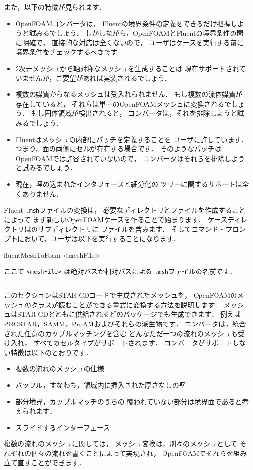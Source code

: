 また，以下の特徴が見られます．
\begin{itemize}
 \item OpenFOAMコンバータは，
       Fluentの境界条件の定義をできるだけ把握しようと試みるでしょう．
       しかしながら，OpenFOAMとFluentの境界条件の間に明確で，
       直接的な対応は全くないので，
       ユーザはケースを実行する前に境界条件をチェックするべきです．
 \item 2次元メッシュから軸対称なメッシュを生成することは
       現在サポートされていませんが，ご要望があれば実装されるでしょう．
 \item 複数の媒質からなるメッシュは受入れられません．
       もし複数の流体媒質が存在していると，
       それらは単一のOpenFOAMメッシュに変換されるでしょう．
       もし固体領域が検出されると，
       コンバータは，それを排除しようと試みるでしょう．
 \item Fluentはメッシュの内部にパッチを定義することを
       ユーザに許しています．つまり，面の両側にセルが存在する場合です．
       そのようなパッチはOpenFOAMでは許容されていないので，
       コンバータはそれらを排除しようと試みるでしょう．
 \item 現在，埋め込まれたインタフェースと細分化の
       ツリーに関するサポートは全くありません．
\end{itemize}
Fluent \texttt{.msh}ファイルの変換は，
必要なディレクトリとファイルを作成することによって
まず新しいOpenFOAMケースを作ることで始まります．
ケースディレクトリはのサブディレクトリに
ファイルを含みます．
そしてコマンド・プロンプトにおいて，ユーザは以下を実行することになります．
\begin{OFverbatim}[terminal]
fluentMeshToFoam <meshFile>
\end{OFverbatim}
ここで \texttt{<meshFile>} は絶対パスか相対パスによる
\texttt{.msh}ファイルの名前です．


\subsection{}
\label{ssec:5.5.2}
このセクションはSTAR-CDコードで生成されたメッシュを，
OpenFOAMのメッシュのクラスが読むことができる書式に変換する方法を説明します．
メッシュはSTAR-CDとともに供給されるどのパッケージでも生成できます．
例えばPROSTAR，SAMM，ProAMおよびそれらの派生物です．
コンバータは，統合された任意のカップルマッチングを含む
どんなただ一つの流れのメッシュも受け入れ，
すべてのセルタイプがサポートされます．
コンバータがサポートしない特徴は以下のとおりです．
\begin{itemize}
 \item 複数の流れのメッシュの仕様
 \item バッフル，すなわち，領域内に挿入された厚さなしの壁
 \item 部分境界，カップルマッチのうちの
       覆われていない部分は境界面であると考えられます．
 \item スライドするインターフェース
\end{itemize}
複数の流れのメッシュに関しては，
メッシュ変換は，別々のメッシュとして
それぞれの個々の流れを書くことによって実現され，
OpenFOAMでそれらを組み立て直すことができます．

